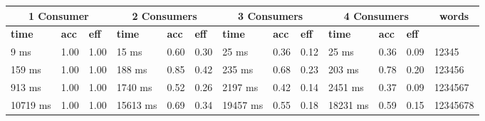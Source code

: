 \documentclass{article}
\begin{document}
\begin{table}[]\begin{tabular}{|l|l|l|l|l|l|l|l|l|l|l|l|l|}\hline
\multicolumn{3}{|c|}{\textbf{1 Consumer}} & \multicolumn{3}{|c|}{\textbf{2 Consumers}} & \multicolumn{3}{|c|}{\textbf{3 Consumers}} & \multicolumn{3}{|c|}{\textbf{4 Consumers}} & \multicolumn{1}{|c|}{\textbf{words}} \\ \hline
\textbf{time} & \textbf{acc} & \textbf{eff} &\textbf{time} & \textbf{acc} & \textbf{eff} &\textbf{time} & \textbf{acc} & \textbf{eff} &\textbf{time} & \textbf{acc} & \textbf{eff} &\\ \hline
9 ms & 1.00 & 1.00 & 15 ms & 0.60 & 0.30 & 25 ms & 0.36 & 0.12 & 25 ms & 0.36 & 0.09 & 12345\\ \hline
159 ms & 1.00 & 1.00 & 188 ms & 0.85 & 0.42 & 235 ms & 0.68 & 0.23 & 203 ms & 0.78 & 0.20 & 123456\\ \hline
913 ms & 1.00 & 1.00 & 1740 ms & 0.52 & 0.26 & 2197 ms & 0.42 & 0.14 & 2451 ms & 0.37 & 0.09 & 1234567\\ \hline
10719 ms & 1.00 & 1.00 & 15613 ms & 0.69 & 0.34 & 19457 ms & 0.55 & 0.18 & 18231 ms & 0.59 & 0.15 & 12345678\\ \hline
\end{tabular}
\end{table}
\end{document}
